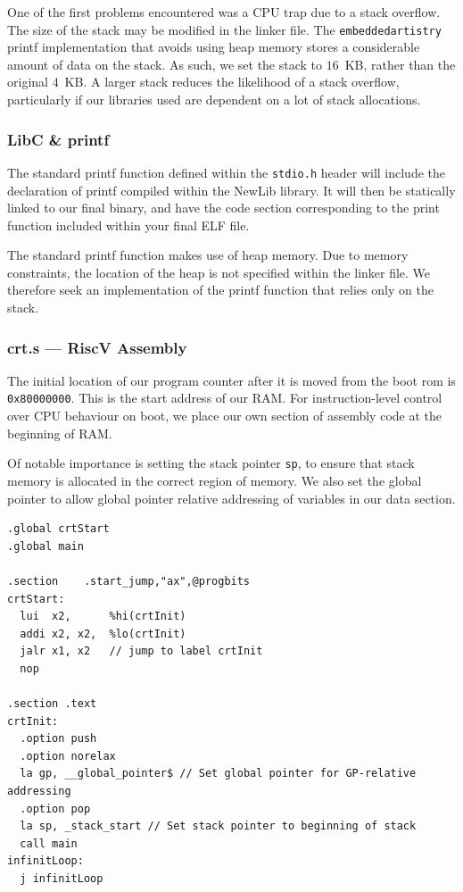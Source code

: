 \documentclass[a4paper,8pt]{report}
\begin{document}
One of the first problems encountered was a CPU trap due to a stack overflow.
The size of the stack may be modified in the linker file. The \texttt{embeddedartistry}
printf implementation that avoids using heap memory stores a considerable amount
of data on the stack. As such, we set the stack to $16$~KB, rather than the
original $4$~KB. A larger stack reduces the likelihood of a stack overflow,
particularly if our libraries used are dependent on a lot of stack allocations.

\subsubsection{LibC \& printf}
The standard printf function defined within the \texttt{stdio.h} header will
include the declaration of printf compiled within the NewLib library. It will
then be statically linked to our final binary, and have the code section
corresponding to the print function included within your final ELF file.

The standard printf function makes use of heap memory. Due to memory
constraints, the location of the heap is not specified within the linker file.
We therefore seek an implementation of the printf function that relies only on
the stack. 

\subsubsection{crt.s --- RiscV Assembly}
The initial location of our program counter after it is moved from the boot rom
is \texttt{0x80000000}. This is the start address of our RAM. For
instruction-level control over CPU behaviour on boot, we place our own section
of assembly code at the beginning of RAM.

Of notable importance is setting the stack pointer \texttt{sp}, to ensure that
stack memory is allocated in the correct region of memory. We also set the
global pointer to allow global pointer relative addressing of variables in our
data section.


\lstset{language=[RISC-V]Assembler, style=customrv}
\begin{lstlisting}
.global crtStart
.global main

.section	.start_jump,"ax",@progbits
crtStart:
  lui  x2,      %hi(crtInit)
  addi x2, x2,  %lo(crtInit)
  jalr x1, x2   // jump to label crtInit
  nop

.section .text
crtInit:
  .option push
  .option norelax
  la gp, __global_pointer$ // Set global pointer for GP-relative addressing
  .option pop
  la sp, _stack_start // Set stack pointer to beginning of stack
  call main
infinitLoop:
  j infinitLoop

\end{lstlisting}
\lstset{}
\end{document}
